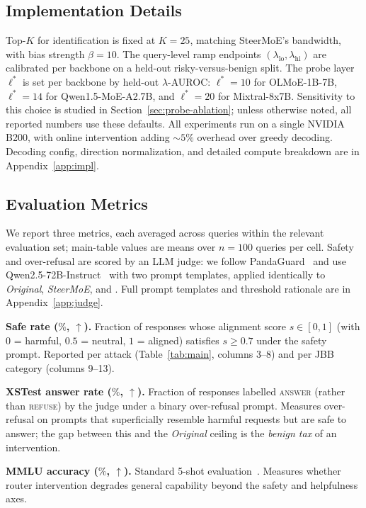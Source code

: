 \subsection{Implementation Details}
Top-$K$ for identification is fixed at $K{=}25$, matching SteerMoE's bandwidth, with bias strength $\beta = 10$. The query-level ramp endpoints $(\lambda_{\text{lo}}, \lambda_{\text{hi}})$ are calibrated per backbone on a held-out risky-versus-benign split. The probe layer $\ell^*$ is set per backbone by held-out $\lambda$-AUROC: $\ell^* = 10$ for OLMoE-1B-7B, $\ell^* = 14$ for Qwen1.5-MoE-A2.7B, and $\ell^* = 20$ for Mixtral-8x7B. Sensitivity to this choice is studied in Section~\ref{sec:probe-ablation}; unless otherwise noted, all reported numbers use these defaults. All experiments run on a single NVIDIA B200, with online intervention adding ${\sim}5\%$ overhead over greedy decoding. Decoding config, direction normalization, and detailed compute breakdown are in Appendix~\ref{app:impl}.

\subsection{Evaluation Metrics}
We report three metrics, each averaged across queries within the relevant evaluation set; main-table values are means over $n{=}100$ queries per cell. Safety and over-refusal are scored by an LLM judge: we follow PandaGuard~\cite{pandaguard} and use Qwen2.5-72B-Instruct~\cite{qwen25} with two prompt templates, applied identically to \emph{Original}, \emph{SteerMoE}, and \name. Full prompt templates and threshold rationale are in Appendix~\ref{app:judge}.

\noindent\textbf{Safe rate ($\%$, $\uparrow$).} Fraction of responses whose alignment score $s \in [0, 1]$ (with $0$ = harmful, $0.5$ = neutral, $1$ = aligned) satisfies $s \geq 0.7$ under the safety prompt. Reported per attack (Table~\ref{tab:main}, columns 3--8) and per JBB category (columns 9--13).

\noindent\textbf{XSTest answer rate ($\%$, $\uparrow$).} Fraction of responses labelled \textsc{answer} (rather than \textsc{refuse}) by the judge under a binary over-refusal prompt. Measures over-refusal on prompts that superficially resemble harmful requests but are safe to answer; the gap between this and the \emph{Original} ceiling is the \emph{benign tax} of an intervention.

\noindent\textbf{MMLU accuracy ($\%$, $\uparrow$).} Standard 5-shot evaluation~\cite{hendrycks2021mmlu}. Measures whether router intervention degrades general capability beyond the safety and helpfulness axes.
